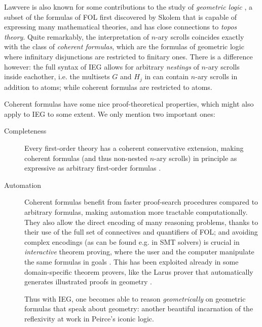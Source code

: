 Lawvere is also known for some contributions to the study of \emph{geometric
logic} , a subset of the formulas of FOL first
discovered by Skolem  that is capable of expressing
many mathematical theories, and has close connections to \emph{topos theory}.
Quite remarkably, the interpretation of $n$-ary scrolls coincides exactly with
the class of \emph{coherent formulas}, which are the formulas of geometric logic
where infinitary disjunctions are restricted to finitary ones. There is a
difference however: the full syntax of IEG allows for arbitrary \emph{nestings}
of $n$-ary scrolls inside eachother, i.e. the multisets $G$ and $H_j$ in
 can contain $n$-ary scrolls in addition to atoms; while
coherent formulas are restricted to atoms.

Coherent formulas have some nice proof-theoretical properties, which might also
apply to IEG to some extent. We only mention two important ones:
\begin{description}
  \item[Completeness] Every first-order theory has a coherent conservative
  extension, making coherent formulas (and thus non-nested $n$-ary scrolls) in
  principle as expressive as arbitrary first-order formulas
  .
  
  \item[Automation] Coherent formulas benefit from faster proof-search
  procedures compared to arbitrary formulas, making automation more tractable
  computationally. They also allow the direct encoding of many reasoning
  problems, thanks to their use of the full set of connectives and quantifiers
  of FOL; and avoiding complex encodings (as can be found e.g. in SMT solvers)
  is crucial in \emph{interactive} theorem proving, where the user and the
  computer manipulate the same formulas in goals
  . This has been exploited already in some
  domain-specific theorem provers, like the Larus prover that automatically
  generates illustrated proofs in geometry
  .
  
  \begin{remark}
  Thus with IEG, one becomes able to reason \emph{geometrically} on geometric
  formulas that speak about geometry: another beautiful incarnation of the
  reflexivity at work in Peirce's iconic logic.
  \end{remark}
\end{description}

